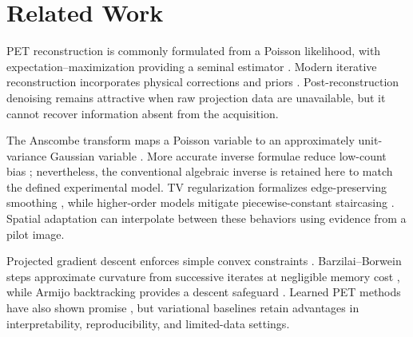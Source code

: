 \section{Related Work}
PET reconstruction is commonly formulated from a Poisson likelihood, with expectation--maximization providing a seminal estimator \citep{shepp1982maximum}. Modern iterative reconstruction incorporates physical corrections and priors \citep{qi2006iterative}. Post-reconstruction denoising remains attractive when raw projection data are unavailable, but it cannot recover information absent from the acquisition.

The Anscombe transform maps a Poisson variable to an approximately unit-variance Gaussian variable \citep{anscombe1948transformation}. More accurate inverse formulae reduce low-count bias \citep{makitalo2011optimal}; nevertheless, the conventional algebraic inverse is retained here to match the defined experimental model. TV regularization formalizes edge-preserving smoothing \citep{rudin1992nonlinear}, while higher-order models mitigate piecewise-constant staircasing \citep{bredies2010total}. Spatial adaptation can interpolate between these behaviors using evidence from a pilot image.

Projected gradient descent enforces simple convex constraints \citep{bertsekas1999nonlinear}. Barzilai--Borwein steps approximate curvature from successive iterates at negligible memory cost \citep{barzilai1988two}, while Armijo backtracking provides a descent safeguard \citep{nocedal2006numerical}. Learned PET methods have also shown promise \citep{gong2019pet}, but variational baselines retain advantages in interpretability, reproducibility, and limited-data settings.
